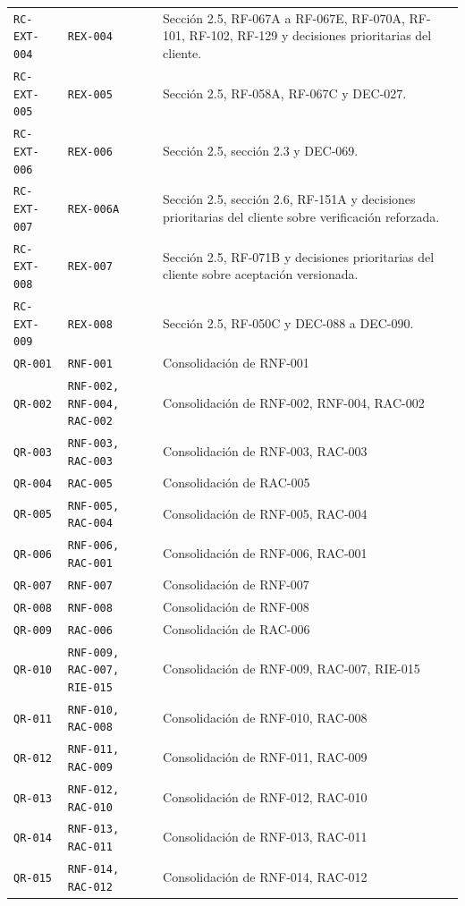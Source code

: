 \documentclass[10pt,letterpaper]{article}
\begin{document}
\begin{landscape}
\begin{longtable}{P{2.7cm}P{2.6cm}P{15.7cm}}
\texttt{RC-EXT-004} & \texttt{REX-004} & Sección 2.5, RF-067A a RF-067E, RF-070A, RF-101, RF-102, RF-129 y decisiones prioritarias del cliente.\\
\texttt{RC-EXT-005} & \texttt{REX-005} & Sección 2.5, RF-058A, RF-067C y DEC-027.\\
\texttt{RC-EXT-006} & \texttt{REX-006} & Sección 2.5, sección 2.3 y DEC-069.\\
\texttt{RC-EXT-007} & \texttt{REX-006A} & Sección 2.5, sección 2.6, RF-151A y decisiones prioritarias del cliente sobre verificación reforzada.\\
\texttt{RC-EXT-008} & \texttt{REX-007} & Sección 2.5, RF-071B y decisiones prioritarias del cliente sobre aceptación versionada.\\
\texttt{RC-EXT-009} & \texttt{REX-008} & Sección 2.5, RF-050C y DEC-088 a DEC-090.\\
\texttt{QR-001} & \texttt{RNF-001} & Consolidación de RNF-001\\
\texttt{QR-002} & \texttt{RNF-002, RNF-004, RAC-002} & Consolidación de RNF-002, RNF-004, RAC-002\\
\texttt{QR-003} & \texttt{RNF-003, RAC-003} & Consolidación de RNF-003, RAC-003\\
\texttt{QR-004} & \texttt{RAC-005} & Consolidación de RAC-005\\
\texttt{QR-005} & \texttt{RNF-005, RAC-004} & Consolidación de RNF-005, RAC-004\\
\texttt{QR-006} & \texttt{RNF-006, RAC-001} & Consolidación de RNF-006, RAC-001\\
\texttt{QR-007} & \texttt{RNF-007} & Consolidación de RNF-007\\
\texttt{QR-008} & \texttt{RNF-008} & Consolidación de RNF-008\\
\texttt{QR-009} & \texttt{RAC-006} & Consolidación de RAC-006\\
\texttt{QR-010} & \texttt{RNF-009, RAC-007, RIE-015} & Consolidación de RNF-009, RAC-007, RIE-015\\
\texttt{QR-011} & \texttt{RNF-010, RAC-008} & Consolidación de RNF-010, RAC-008\\
\texttt{QR-012} & \texttt{RNF-011, RAC-009} & Consolidación de RNF-011, RAC-009\\
\texttt{QR-013} & \texttt{RNF-012, RAC-010} & Consolidación de RNF-012, RAC-010\\
\texttt{QR-014} & \texttt{RNF-013, RAC-011} & Consolidación de RNF-013, RAC-011\\
\texttt{QR-015} & \texttt{RNF-014, RAC-012} & Consolidación de RNF-014, RAC-012\\
\bottomrule
\end{longtable}
\end{landscape}
\end{document}

